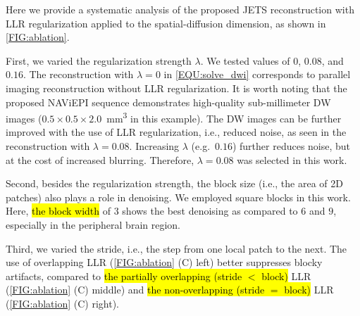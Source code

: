 \documentclass[preprint,12pt,authoryear,review]{elsarticle}
\begin{document}
    Here we provide a systematic analysis of
    the proposed JETS reconstruction
    with LLR regularization applied to
    the spatial-diffusion dimension, as shown in \cref{FIG:ablation}.

    First, we varied the regularization strength $\lambda$.
    We tested values of $0$, $0.08$, and $0.16$.
    The reconstruction with $\lambda = 0$ in \cref{EQU:solve_dwi}
    corresponds to parallel imaging reconstruction
    without LLR regularization.
    It is worth noting that the proposed NAViEPI sequence
    demonstrates high-quality sub-millimeter DW images
    ($0.5\times0.5\times2.0$~\si{\cubic\mm} in this example).
    The DW images can be further improved
    with the use of LLR regularization, i.e., reduced noise,
    as seen in the reconstruction with $\lambda=0.08$.
    Increasing $\lambda$ (e.g.~$0.16$) further reduces noise,
    but at the cost of increased blurring.
    Therefore, $\lambda=0.08$ was selected in this work.

    Second, besides the regularization strength,
    the block size (i.e., the area of 2D patches) also
    plays a role in denoising.
    We employed square blocks in this work.
    Here, \hl{the block width} of $3$ shows the best denoising
    as compared to $6$ and $9$,
    especially in the peripheral brain region.

    Third, we varied the stride, i.e.,
    the step from one local patch to the next.
    The use of overlapping LLR
    (\cref{FIG:ablation} (C) left)
    better suppresses blocky artifacts,
    compared to \hl{the partially overlapping (stride $<$ block)} LLR
    (\cref{FIG:ablation} (C) middle)
    and \hl{the non-overlapping (stride $=$ block)} LLR
    (\cref{FIG:ablation} (C) right).
\end{document}
